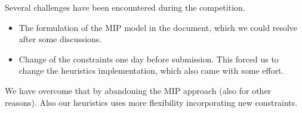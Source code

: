 \documentclass[a4paper]{article}
\begin{document}
Several challenges have been encountered during the competition. 
\begin{itemize}
    \item The formulation of the MIP model in the document, which we could resolve after some discussions.
    \item Change of the constraints one day before submission. This forced us to change the heuristics implementation, which also came with some effort.
\end{itemize}
We have overcome that by abandoning the MIP approach (also for other reasons).
Also our heuristics uses more flexibility incorporating new constraints.
\end{document}
